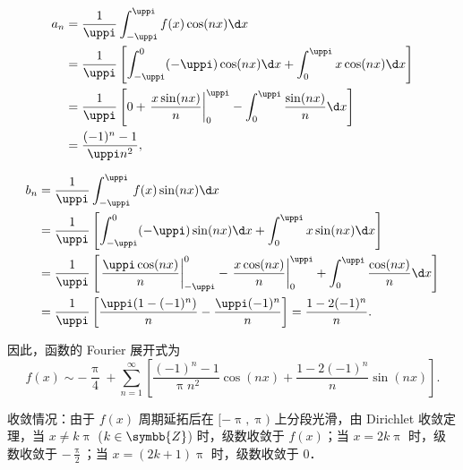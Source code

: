 \begin{solution}
    \begin{equation}
        \begin{aligned}
            a_n & = \frac{1}{\uppi} \int_{-\uppi}^{\uppi} f(x) \cos(nx) \d x                                                                      \\
                & = \frac{1}{\uppi} \left[ \int_{-\uppi}^{0} (-\uppi) \cos(nx) \d x + \int_{0}^{\uppi} x \cos(nx) \d x \right]                    \\
                & = \frac{1}{\uppi} \left[ 0 + \left. \frac{x \sin(nx)}{n} \right|_{0}^{\uppi} - \int_{0}^{\uppi} \frac{\sin(nx)}{n} \d x \right] \\
                & = \frac{(-1)^n - 1}{\uppi n^2},
        \end{aligned}
    \end{equation}

    \begin{equation}
        \begin{aligned}
            b_n & = \frac{1}{\uppi} \int_{-\uppi}^{\uppi} f(x) \sin(nx) \d x                                                                                                                         \\
                & = \frac{1}{\uppi} \left[ \int_{-\uppi}^{0} (-\uppi) \sin(nx) \d x + \int_{0}^{\uppi} x \sin(nx) \d x \right]                                                                       \\
                & = \frac{1}{\uppi} \left[ \left. \frac{\uppi \cos(nx)}{n} \right|_{-\uppi}^{0} - \left. \frac{x \cos(nx)}{n} \right|_{0}^{\uppi} + \int_{0}^{\uppi} \frac{\cos(nx)}{n} \d x \right] \\
                & = \frac{1}{\uppi} \left[ \frac{\uppi(1 - (-1)^n)}{n} - \frac{\uppi(-1)^n}{n} \right] = \frac{1 - 2(-1)^n}{n}.
        \end{aligned}
    \end{equation}

    因此，函数的 Fourier 展开式为
    \begin{equation}
        \boxed{f(x) \sim -\frac{\uppi}{4} + \sum_{n=1}^{\infty} \left[ \frac{(-1)^n - 1}{\uppi n^2} \cos(nx) + \frac{1 - 2(-1)^n}{n} \sin(nx) \right]}.
    \end{equation}

    收敛情况：由于 $f(x)$ 周期延拓后在 $[-\uppi, \uppi)$ 上分段光滑，由 Dirichlet 收敛定理，当 $x \neq k\uppi$ ($k \in \symbb{Z}$) 时，级数收敛于 $f(x)$；当 $x = 2k\uppi$ 时，级数收敛于 $-\frac{\uppi}{2}$；当 $x = (2k+1)\uppi$ 时，级数收敛于 $0$．


\end{solution}
